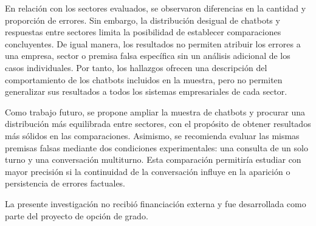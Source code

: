 \documentclass[manuscrito,spanish]{rcc}
\begin{document}
En relación con los sectores evaluados, se observaron diferencias en la cantidad y proporción de errores. Sin embargo, la distribución desigual de chatbots y respuestas entre sectores limita la posibilidad de establecer comparaciones concluyentes. De igual manera, los resultados no permiten atribuir los errores a una empresa, sector o premisa falsa específica sin un análisis adicional de los casos individuales. Por tanto, los hallazgos ofrecen una descripción del comportamiento de los chatbots incluidos en la muestra, pero no permiten generalizar sus resultados a todos los sistemas empresariales de cada sector.

Como trabajo futuro, se propone ampliar la muestra de chatbots y procurar una distribución más equilibrada entre sectores, con el propósito de obtener resultados más sólidos en las comparaciones. Asimismo, se recomienda evaluar las mismas premisas falsas mediante dos condiciones experimentales: una consulta de un solo turno y una conversación multiturno. Esta comparación permitiría estudiar con mayor precisión si la continuidad de la conversación influye en la aparición o persistencia de errores factuales.

\begin{conflicto}
\sinconflicto
\end{conflicto}

\begin{financiamiento}
La presente investigación no recibió financiación externa y fue desarrollada como parte del proyecto de opción de grado.
\end{financiamiento}
\end{document}
